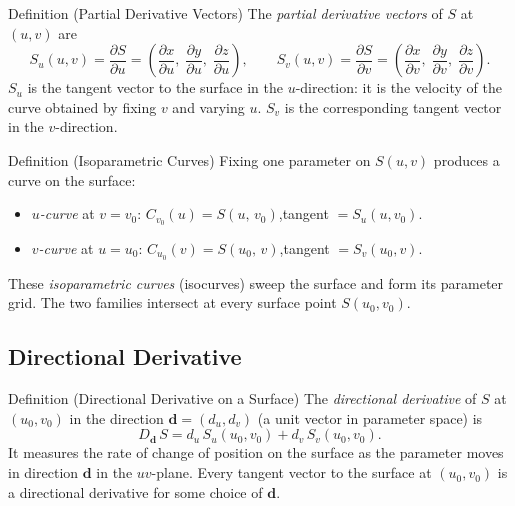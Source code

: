 \begin{propositionbox}{Definition (Partial Derivative Vectors)}
The \emph{partial derivative vectors} of $S$ at $(u,v)$ are
\[
  S_u(u,v) = \frac{\partial S}{\partial u}
  = \left(\frac{\partial x}{\partial u},\;
          \frac{\partial y}{\partial u},\;
          \frac{\partial z}{\partial u}\right),
  \qquad
  S_v(u,v) = \frac{\partial S}{\partial v}
  = \left(\frac{\partial x}{\partial v},\;
          \frac{\partial y}{\partial v},\;
          \frac{\partial z}{\partial v}\right).
\]
$S_u$ is the tangent vector to the surface in the $u$-direction:
it is the velocity of the curve obtained by fixing $v$ and varying $u$.
$S_v$ is the corresponding tangent vector in the $v$-direction.
\end{propositionbox}

\begin{propositionbox}{Definition (Isoparametric Curves)}
Fixing one parameter on $S(u,v)$ produces a curve on the surface:
\begin{itemize}
  \item \emph{$u$-curve} at $v = v_0$:\quad
        $C_{v_0}(u) = S(u,\,v_0)$,\quad tangent $= S_u(u,v_0)$.
  \item \emph{$v$-curve} at $u = u_0$:\quad
        $C_{u_0}(v) = S(u_0,\,v)$,\quad tangent $= S_v(u_0,v)$.
\end{itemize}
These \emph{isoparametric curves} (isocurves) sweep the surface and
form its parameter grid.
The two families intersect at every surface point $S(u_0,v_0)$.
\end{propositionbox}

\subsection*{Directional Derivative}

\begin{propositionbox}{Definition (Directional Derivative on a Surface)}
The \emph{directional derivative} of $S$ at $(u_0,v_0)$ in the
direction $\mathbf{d} = (d_u, d_v)$ (a unit vector in parameter space) is
\[
  D_{\mathbf{d}}\,S = d_u\,S_u(u_0,v_0) + d_v\,S_v(u_0,v_0).
\]
It measures the rate of change of position on the surface as the
parameter moves in direction $\mathbf{d}$ in the $uv$-plane.
Every tangent vector to the surface at $(u_0,v_0)$ is a directional
derivative for some choice of $\mathbf{d}$.
\end{propositionbox}

